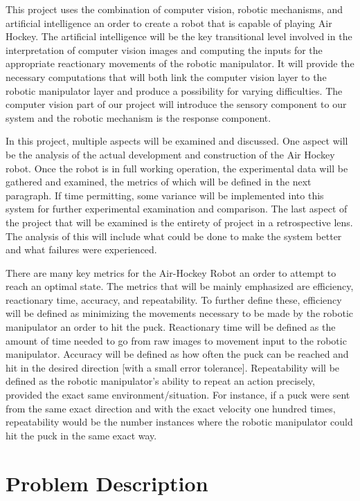 \documentclass[letterpaper, 10 pt, conference]{ieeeconf}
\begin{document}
This project uses the combination of computer vision, robotic mechanisms, and artificial intelligence an order to create a  robot that is capable of playing Air Hockey. The artificial intelligence will be the key transitional level involved in the interpretation of computer vision images and computing the inputs for the appropriate reactionary movements of the robotic manipulator.  It will provide the necessary computations that will both link the computer vision layer to the robotic manipulator layer and produce a possibility for varying difficulties.  The computer vision part of our project will introduce the sensory component to our system and the robotic mechanism is the response component.

In this project, multiple aspects will be examined and discussed.  One aspect will be the analysis of the actual development and construction of the Air Hockey robot.  Once the robot is in full working operation, the experimental data will be gathered and examined, the metrics of which will be defined in the next paragraph.  If time permitting, some variance will be implemented into this system for further experimental examination and comparison.  The last aspect of the project that will be examined is the entirety of project in a retrospective lens.  The analysis of this will include what could be done to make the system better and what failures were experienced.

There are many key metrics for the Air-Hockey Robot an order to attempt to reach an optimal state. The metrics that will be mainly emphasized are efficiency, reactionary time, accuracy, and repeatability. To further define these, efficiency will be defined as minimizing the movements necessary to be made by the robotic manipulator an order to hit the puck.  Reactionary time will be defined as the amount of time needed to go from raw images to movement input to the robotic manipulator. Accuracy will be defined as how often the puck can be reached and hit in the desired direction [with a small error tolerance].  Repeatability will be defined as the robotic manipulator’s ability to repeat an action precisely, provided the exact same environment/situation. For instance, if a puck were sent from the same exact direction and with the exact velocity one hundred times, repeatability would be the number instances where the robotic manipulator could hit the puck in the same exact way.

\section{Problem Description}
\label{sec:problem_description}
\end{document}
